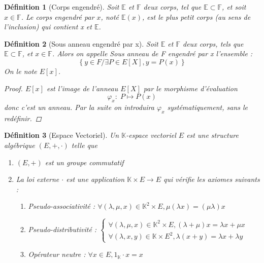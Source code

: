 \documentclass[a4paper,12pt,french,draft]{report}
\newtheorem{definition}{Définition}[section]
\begin{document}
			\begin{definition}[Corps engendré]
				Soit \(\mathbb{E}\) et \(\mathbb{F}\) deux corps, tel que \(\mathbb{E} \subset \mathbb{F}\), et soit \(x \in \mathbb{F} \). Le corps engendré par \(x\), noté \(\mathbb{E}(x)\), est le plus petit corps (au sens de l'inclusion) qui contient x et \(\mathbb{E}\).
			\end{definition}
			
			\begin{definition}[Sous anneau engendré par x]
				Soit \(\mathbb{E}\) et \(\mathbb{F}\) deux corps, tels que \(\mathbb{E}\subset\mathbb{F}\), et \(x\in\mathbb{F}\). Alors on appelle \emph{Sous anneau de F engendré par x} l'ensemble :
				\[\left\{y\in F / \exists P \in E[X], y = P(x)\right\}\]
				On le note \(E[x]\).{}
				
				\begin{proof}
					\(E[x]\) est l'image de l'anneau \(E[X]\) par le morphisme d'évaluation \[\varphi_{x} : \; P \mapsto P(x) \] donc c'est un anneau. Par la suite on introduira \(\varphi_{x}\) systématiquement, sans le redéfinir.
				\end{proof}
				
			\end{definition}
			
			
			\begin{definition}[Espace Vectoriel]
				Un \(\mathbb{K}\)-espace vectoriel \(E\)  est une structure algébrique \( (E, + , \cdot)\) telle que
				\begin{enumerate}
					\item \( (E, +) \) est un groupe commutatif
					\item La loi externe \( \cdot \) est une application \( \mathbb{K} \times E \longrightarrow E \) qui vérifie les axiomes suivants :
						\begin{enumerate}
							\item Pseudo-associativité :
								\(
								\forall (\lambda, \mu, x) \in \mathbb{K}^2 \times E, \mu(\lambda x) = (\mu \lambda) x
								\)
							\item Pseudo-distributivité :
								\(
								\left\{
									\begin{array}{ll}
										\forall (\lambda, \mu, x) \in \mathbb{K}^2 \times E , (\lambda + \mu)x = \lambda x + \mu x \\
										\forall (\lambda, x, y) \in \mathbb{K} \times E^2 , \lambda(x + y) = \lambda x + \lambda y
									\end{array}
								\right.
								\)
							\item Opérateur neutre :
								\(
								\forall x \in E, 1_\mathbb{K} \cdot x = x
								\)
						\end{enumerate}
				\end{enumerate}
				
			\end{definition}
			
\end{document}
